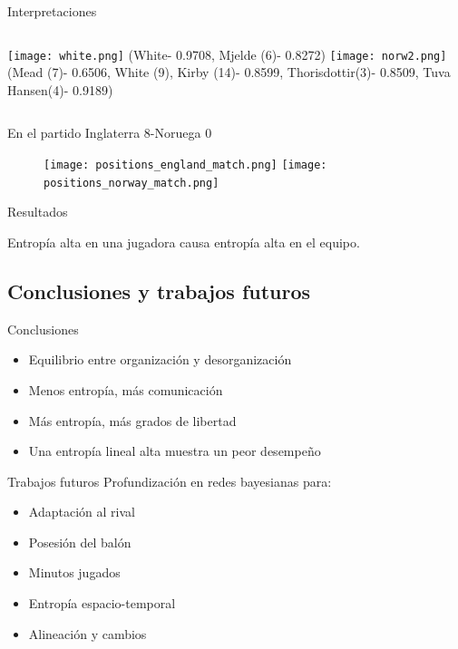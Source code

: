 \documentclass{beamer}
\begin{document}
\begin{frame}{Interpretaciones}
	\begin{columns}[t]
		\texttt{[image: white.png]}
		\footnotesize(White- 0.9708, Mjelde (6)- 0.8272)
		\texttt{[image: norw2.png]}
		\footnotesize(Mead (7)- 0.6506, White (9), Kirby (14)- 0.8599, Thorisdottir(3)- 0.8509, Tuva Hansen(4)- 0.9189)
	\end{columns} 
\end{frame}

\begin{frame}{En el partido Inglaterra 8-Noruega 0}
	\begin{figure}
		\centering
			\texttt{[image: positions\_england\_match.png]}
			\texttt{[image: positions\_norway\_match.png]}
		\end{figure}
\end{frame}

\begin{frame}{Resultados}
	\begin{figure}
		\centering
	\end{figure}
	Entropía alta en una jugadora causa entropía alta en el equipo.
\end{frame}

%
\subsection{Conclusiones y trabajos futuros}

\begin{frame}{Conclusiones}
	\begin{itemize}
		\item Equilibrio entre organización y desorganización
		\item Menos entropía, más comunicación
		\item Más entropía, más grados de libertad 
		\item Una entropía lineal alta muestra un peor desempeño
	\end{itemize}
\end{frame}

\begin{frame}{Trabajos futuros}
	Profundización en redes bayesianas para:
	\begin{itemize}
		\item Adaptación al rival
		\item Posesión del balón
		\item Minutos jugados
		\item Entropía espacio-temporal
		\item Alineación y cambios
	\end{itemize}
\end{frame}
\end{document}
